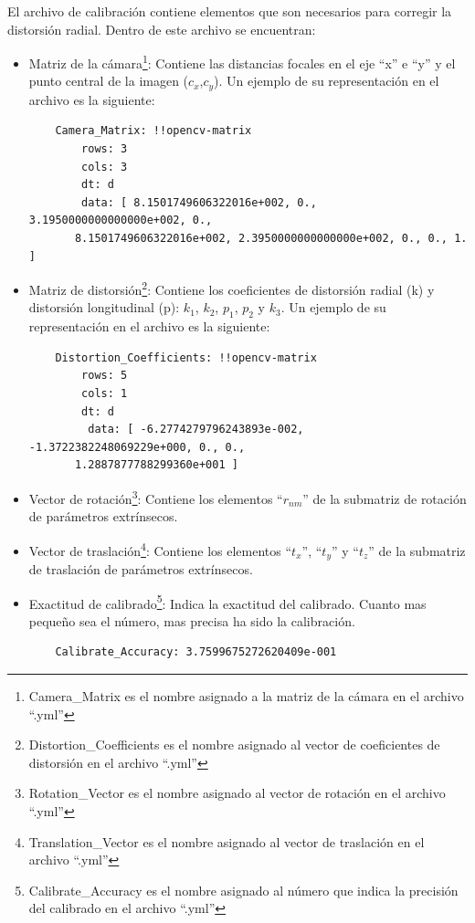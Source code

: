 El archivo de calibración contiene elementos que son necesarios para corregir la distorsión radial. Dentro de este archivo se encuentran:
\begin{itemize}
    \item Matriz de la cámara\footnote{Camera\_Matrix es el nombre asignado a la matriz de la cámara en el archivo ``.yml''}: Contiene las distancias focales en el eje ``x'' e ``y'' y el punto central de la imagen ($c_x$,$c_y$). Un ejemplo de su representación en el archivo es la siguiente:\\
    
    \begin{verbatim}
    Camera_Matrix: !!opencv-matrix
        rows: 3
        cols: 3
        dt: d
        data: [ 8.1501749606322016e+002, 0., 3.1950000000000000e+002, 0.,
       8.1501749606322016e+002, 2.3950000000000000e+002, 0., 0., 1. ]
    \end{verbatim}
    
    \item Matriz de distorsión\footnote{Distortion\_Coefficients es el nombre asignado al vector de coeficientes de distorsión en el archivo ``.yml''}: Contiene los coeficientes de distorsión radial (k) y distorsión longitudinal (p): $k_1$, $k_2$, $p_1$, $p_2$ y $k_3$.  Un ejemplo de su representación en el archivo es la siguiente:\\
    \begin{verbatim}
    Distortion_Coefficients: !!opencv-matrix
        rows: 5
        cols: 1
        dt: d
         data: [ -6.2774279796243893e-002, -1.3722382248069229e+000, 0., 0.,
       1.2887877788299360e+001 ]
    \end{verbatim} 

    \item Vector de rotación\footnote{Rotation\_Vector es el nombre asignado al vector de rotación en el archivo ``.yml''}: Contiene los elementos ``$r_{nm}$'' de la submatriz de rotación de parámetros extrínsecos.
    \item Vector de traslación\footnote{Translation\_Vector es el nombre asignado al vector de traslación en el archivo ``.yml''}: Contiene los elementos ``$t_{x}$'', ``$t_{y}$'' y ``$t_{z}$'' de la submatriz de traslación de parámetros extrínsecos.
    \item Exactitud de calibrado\footnote{Calibrate\_Accuracy es el nombre asignado al número que indica la precisión del calibrado en el archivo ``.yml''}: Indica la exactitud del calibrado. Cuanto mas pequeño sea el número, mas precisa ha sido la calibración. \\
    \begin{verbatim}
    Calibrate_Accuracy: 3.7599675272620409e-001
    \end{verbatim} 
\end{itemize}






